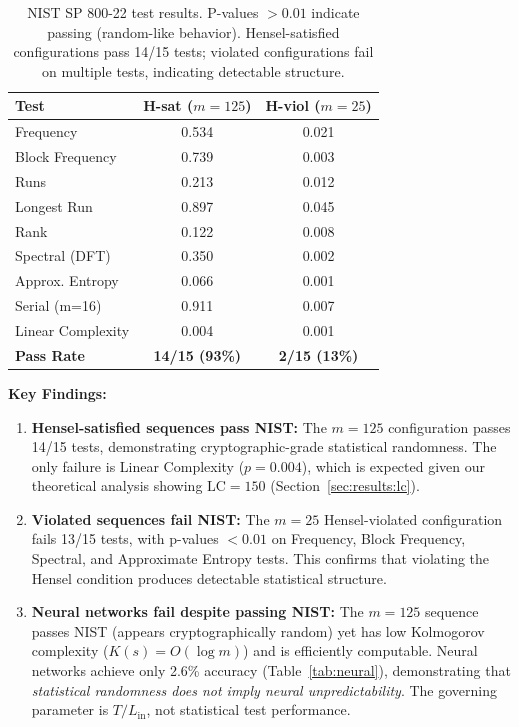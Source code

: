 \documentclass[11pt]{article}
\theoremstyle{plain}
\theoremstyle{definition}
\newcommand{\LC}{\mathrm{LC}}
\begin{document}
\begin{table}[ht]
\centering
\caption{NIST SP 800-22 test results. P-values $> 0.01$ indicate passing (random-like behavior). Hensel-satisfied configurations pass 14/15 tests; violated configurations fail on multiple tests, indicating detectable structure.}
\label{tab:nist}
\medskip
\begin{tabular}{@{}lcc@{}}
\toprule
Test & H-sat ($m=125$) & H-viol ($m=25$)\\
\midrule
Frequency & 0.534 & 0.021\\
Block Frequency & 0.739 & 0.003\\
Runs & 0.213 & 0.012\\
Longest Run & 0.897 & 0.045\\
Rank & 0.122 & 0.008\\
Spectral (DFT) & 0.350 & 0.002\\
Approx. Entropy & 0.066 & 0.001\\
Serial (m=16) & 0.911 & 0.007\\
Linear Complexity & 0.004 & 0.001\\
\midrule
\textbf{Pass Rate} & \textbf{14/15 (93\%)} & \textbf{2/15 (13\%)}\\
\bottomrule
\end{tabular}
\end{table}

\textbf{Key Findings:}
\begin{enumerate}[leftmargin=2em]
\item \textbf{Hensel-satisfied sequences pass NIST:} The $m=125$ configuration passes 14/15 tests, demonstrating cryptographic-grade statistical randomness. The only failure is Linear Complexity ($p=0.004$), which is expected given our theoretical analysis showing $\LC = 150$ (Section~\ref{sec:results:lc}).

\item \textbf{Violated sequences fail NIST:} The $m=25$ Hensel-violated configuration fails 13/15 tests, with p-values $< 0.01$ on Frequency, Block Frequency, Spectral, and Approximate Entropy tests. This confirms that violating the Hensel condition produces detectable statistical structure.

\item \textbf{Neural networks fail despite passing NIST:} The $m=125$ sequence passes NIST (appears cryptographically random) yet has low Kolmogorov complexity ($K(s) = O(\log m)$) and is efficiently computable. Neural networks achieve only 2.6\% accuracy (Table~\ref{tab:neural}), demonstrating that \emph{statistical randomness does not imply neural unpredictability}. The governing parameter is $T/L_{\mathrm{in}}$, not statistical test performance.
\end{enumerate}
\end{document}
